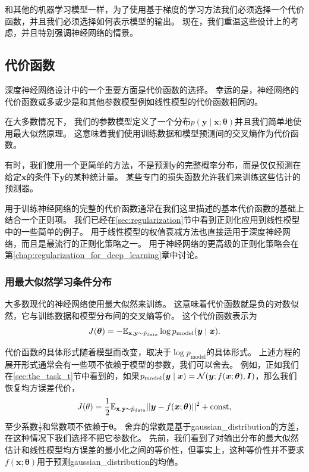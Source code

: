 和其他的机器学习模型一样，为了使用基于梯度的学习方法我们必须选择一个代价函数，并且我们必须选择如何表示模型的输出。
现在，我们重温这些设计上的考虑，并且特别强调神经网络的情景。

\subsection{代价函数}
\label{sec:cost_functions}

深度神经网络设计中的一个重要方面是代价函数的选择。
幸运的是，神经网络的代价函数或多或少是和其他参数模型例如线性模型的代价函数相同的。

在大多数情况下， 我们的参数模型定义了一个分布$p(\bm{y}\mid\bm{x};\bm{\theta})$并且我们简单地使用最大似然原理。
这意味着我们使用训练数据和模型预测间的交叉熵作为代价函数。

有时，我们使用一个更简单的方法，不是预测$\bm{y}$的完整概率分布，而是仅仅预测在给定$\bm{x}$的条件下$\bm{y}$的某种统计量。
某些专门的损失函数允许我们来训练这些估计的预测器。

用于训练神经网络的完整的代价函数通常在我们这里描述的基本代价函数的基础上结合一个正则项。
我们已经在\ref{sec:regularization}节中看到正则化应用到线性模型中的一些简单的例子。
用于线性模型的权值衰减方法也直接适用于深度神经网络，而且是最流行的正则化策略之一。
用于神经网络的更高级的正则化策略会在第\ref{chap:regularization_for_deep_learning}章中讨论。


\subsubsection{用最大似然学习条件分布}
\label{sec:learning_conditional_distributions_with_maximum_likelihood}

大多数现代的神经网络使用最大似然来训练。
这意味着代价函数就是负的对数似然，它与训练数据和模型分布间的交叉熵等价。
这个代价函数表示为
\begin{equation}
J(\bm{\theta}) = -\mathbb{E}_{\mathbf{x}, \mathbf{y} \sim \hat{p}_\text{data}} \log p_\text{model} (\bm{y} \mid \bm{x}).
\end{equation}

代价函数的具体形式随着模型而改变，取决于$\log p_\text{model}$的具体形式。
上述方程的展开形式通常会有一些项不依赖于模型的参数，我们可以舍去。
例如，正如我们在\ref{sec:the_task_t}节中看到的，如果$p_\text{model}(\bm{y}\mid\bm{x}) = \mathcal{N}(\bm{y};f(\bm{x};\bm{\theta}), \bm{I})$，那么我们恢复均方误差代价，
\begin{equation}
J(\theta) = \frac{1}{2} \mathbb{E}_{\mathbf{x}, \mathbf{y} \sim  \hat{p}_\text{data}} || \bm{y} - f(\bm{x}; \bm{\theta}) ||^2 + \text{const},
\end{equation}
至少系数$\frac{1}{2}$和常数项不依赖于$\bm{\theta}$。
舍弃的常数是基于\gls{gaussian_distribution}的方差，在这种情况下我们选择不把它参数化。
先前，我们看到了对输出分布的最大似然估计和线性模型均方误差的最小化之间的等价性，但事实上，这种等价性并不要求$f(\bm{x}; \bm{\theta})$用于预测\gls{gaussian_distribution}的均值。

